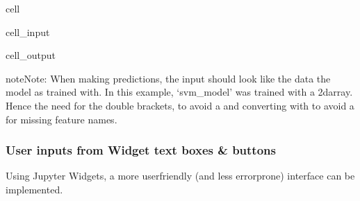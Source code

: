 \documentclass[letterpaper,10pt,english]{jupyterBook}
\begin{document}
\begin{sphinxuseclass}{cell}\begin{sphinxVerbatimInput}

\begin{sphinxuseclass}{cell_input}
\begin{sphinxVerbatim}[commandchars=\\\{\}]
\PYG{p}{[}\PYG{p}{[}   \PYG{p}{]}\PYG{p}{]}
\end{sphinxVerbatim}

\end{sphinxuseclass}\end{sphinxVerbatimInput}
\begin{sphinxVerbatimOutput}

\begin{sphinxuseclass}{cell_output}
\begin{sphinxVerbatim}
\end{sphinxVerbatim}

\end{sphinxuseclass}\end{sphinxVerbatimOutput}

\end{sphinxuseclass}
\begin{sphinxadmonition}{note}{Note:}
\sphinxAtStartPar
When making predictions, the input should look  like the data the model as trained with. In this example, ‘svm\_model’ was trained with a 2d\sphinxhyphen{}array. Hence the need for the double brackets, \sphinxcode{\sphinxupquote{{[}{[}5,4,1,.5{]}{]}}} to avoid a  and converting  with  to avoid a  for missing feature names.
\end{sphinxadmonition}


\subsubsection{User inputs from Widget text boxes \& buttons}
\label{\detokenize{task2_c/example_sup_class/sup_class_ex-ui:user-inputs-from-widget-text-boxes-buttons}}
\sphinxAtStartPar
Using Jupyter Widgets, a more user\sphinxhyphen{}friendly (and less error\sphinxhyphen{}prone) interface can be implemented.
\end{document}
